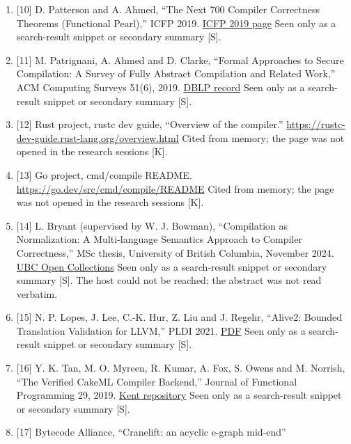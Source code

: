 \documentclass[10pt,letterpaper]{article}
\begin{document}
\begin{enumerate}
  arXiv:2511.10909. \url{https://arxiv.org/html/2511.10909v1} Seen only
  as a search-result snippet or secondary summary {[}S{]}.
\item
  {[}10{]} D. Patterson and A. Ahmed, ``The Next 700 Compiler
  Correctness Theorems (Functional Pearl),'' ICFP 2019.
  \href{https://icfp19.sigplan.org/details/icfp-2019-papers/35/The-Next-700-Compiler-Correctness-Theorems-A-Functional-Pearl-}{ICFP
  2019 page} Seen only as a search-result snippet or secondary summary
  {[}S{]}.
\item
  {[}11{]} M. Patrignani, A. Ahmed and D. Clarke, ``Formal Approaches to
  Secure Compilation: A Survey of Fully Abstract Compilation and Related
  Work,'' ACM Computing Surveys 51(6), 2019.
  \href{https://dblp.org/rec/journals/csur/PatrignaniAC19.html}{DBLP
  record} Seen only as a search-result snippet or secondary summary
  {[}S{]}.
\item
  {[}12{]} Rust project, rustc dev guide, ``Overview of the compiler.''
  \url{https://rustc-dev-guide.rust-lang.org/overview.html} Cited from
  memory; the page was not opened in the research sessions {[}K{]}.
\item
  {[}13{]} Go project, cmd/compile README.
  \url{https://go.dev/src/cmd/compile/README} Cited from memory; the
  page was not opened in the research sessions {[}K{]}.
\item
  {[}14{]} L. Bryant (supervised by W. J. Bowman), ``Compilation as
  Normalization: A Multi-language Semantics Approach to Compiler
  Correctness,'' MSc thesis, University of British Columbia, November
  2024.
  \href{https://open.library.ubc.ca/collections/24/items/1.0445241}{UBC
  Open Collections} Seen only as a search-result snippet or secondary
  summary {[}S{]}. The host could not be reached; the abstract was not
  read verbatim.
\item
  {[}15{]} N. P. Lopes, J. Lee, C.-K. Hur, Z. Liu and J. Regehr,
  ``Alive2: Bounded Translation Validation for LLVM,'' PLDI 2021.
  \href{https://www-old.cs.utah.edu/~regehr/alive2-pldi21.pdf}{PDF} Seen
  only as a search-result snippet or secondary summary {[}S{]}.
\item
  {[}16{]} Y. K. Tan, M. O. Myreen, R. Kumar, A. Fox, S. Owens and M.
  Norrish, ``The Verified CakeML Compiler Backend,'' Journal of
  Functional Programming 29, 2019.
  \href{https://kar.kent.ac.uk/71304/}{Kent repository} Seen only as a
  search-result snippet or secondary summary {[}S{]}.
\item
  {[}17{]} Bytecode Alliance, ``Cranelift: an acyclic e-graph mid-end''

\end{enumerate}
\end{document}

